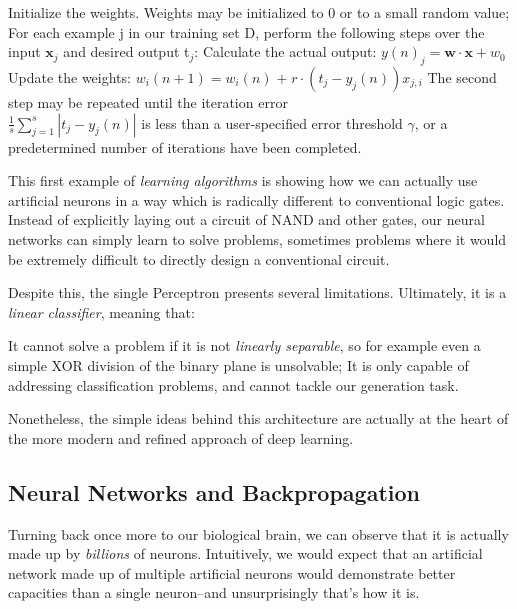 \begin{outline}[enumerate]
    \1 Initialize the weights. Weights may be initialized to $0$ or to a small random value;
    \1 For each example j in our training set D, perform the following steps over the input $\mathbf {x}_{j}$ and desired output t$_{j}$:
    \2 Calculate the actual output: $y(n)_j = \mathbf{w}\cdot\mathbf{x} + w_0 $
    \2 Update the weights:  $w_{i}(n+1)=w_{i}(n)\;{\boldsymbol {+}}\;r\cdot (t_{j}-y_{j}(n))x_{j,i}$
    \1 The second step may be repeated until the iteration error \\
    $\frac{1}{s} \sum_{j=1}^{s}|t_{j}-y_{j}(n)|$ is less than a user-specified error threshold $\gamma$, or a predetermined number of iterations have been completed.
\end{outline}

This first example of \emph{learning algorithms} is showing how we can actually use artificial neurons in a way which is radically different to conventional logic gates. Instead of explicitly laying out a circuit of NAND and other gates, our neural networks can simply learn to solve problems, sometimes problems where it would be extremely difficult to directly design a conventional circuit.

Despite this, the single Perceptron presents several limitations. Ultimately, it is a \emph{linear classifier}, meaning that:

\begin{outline}
    \1 It cannot solve a problem if it is not \emph{linearly separable}, so for example even a simple XOR division of the binary plane is unsolvable;
    \1 It is only capable of addressing classification problems, and cannot tackle our generation task.
\end{outline}

Nonetheless, the simple ideas behind this architecture are actually at the heart of the more modern and refined approach of deep learning.

\subsection{Neural Networks and Backpropagation}

Turning back once more to our biological brain, we can observe that it is actually made up by \emph{billions} of neurons. Intuitively, we would expect that an artificial network made up of multiple artificial neurons would demonstrate better capacities than a single neuron--and unsurprisingly that's how it is. 

